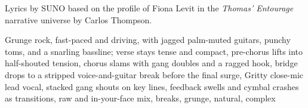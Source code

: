 
\begin{notes}
Lyrics by SUNO based on the profile of Fiona Levit in the \emph{Thomas’ Entourage} narrative universe by Carlos Thompson.
\end{notes}
\begin{style}
Grunge rock, fast-paced and driving, with jagged palm-muted guitars, punchy toms, and a snarling bassline; verse stays tense and compact, pre-chorus lifts into half-shouted tension, chorus slams with gang doubles and a ragged hook, bridge drops to a stripped voice-and-guitar break before the final surge, Gritty close-mic lead vocal, stacked gang shouts on key lines, feedback swells and cymbal crashes as transitions, raw and in-your-face mix, breaks, grunge, natural, complex
\end{style}
